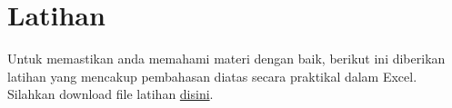 \documentclass[
]{book}
\begin{document}
\hypertarget{latihan}{%
\section{Latihan}\label{latihan}}

Untuk memastikan anda memahami materi dengan baik, berikut ini diberikan latihan yang mencakup pembahasan diatas secara praktikal dalam Excel. Silahkan download file latihan \href{https://github.com/Bakti-Siregar/Matematika-Bisnis/blob/master/data/matematika-manajemen-bisnis.xlsx?raw=true}{disini}.

  
\end{document}
